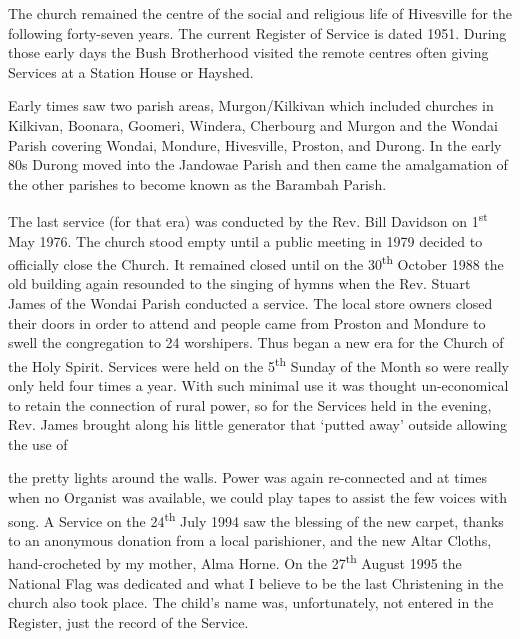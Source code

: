 The church remained the centre of the social and religious life of Hivesville for the following forty-seven years. The current Register of Service is dated 1951. During those early days the Bush Brotherhood visited the remote centres often giving Services at a Station House or Hayshed.

Early times saw two parish areas, Murgon/Kilkivan which included churches in Kilkivan, Boonara, Goomeri, Windera, Cherbourg and Murgon and the Wondai Parish covering Wondai, Mondure, Hivesville, Proston, and Durong. In the early 80s Durong moved into the Jandowae Parish and then came the amalgamation of the other parishes to become known as the Barambah Parish.

The last service (for that era) was conducted by the Rev. Bill Davidson on 1\textsuperscript{st} May 1976. The church stood empty until a public meeting in 1979 decided to officially close the Church. It remained closed until on the 30\textsuperscript{th} October 1988 the old building again resounded to the singing of hymns when the Rev. Stuart James of the Wondai Parish conducted a service. The local store owners closed their doors in order to attend and people came from Proston and Mondure to swell the congregation to 24 worshipers. Thus began a new era for the Church of the Holy Spirit. Services were held on the 5\textsuperscript{th} Sunday of the Month so were really only held four times a year. With such minimal use it was thought un-economical to retain the connection of rural power, so for the Services held in the evening, Rev. James brought along his little generator that `putted away' outside allowing the use of

the pretty lights around the walls. Power was again re-connected and at times when no Organist was available, we could play tapes to assist the few voices with song. A Service on the 24\textsuperscript{th} July 1994 saw the blessing of the new carpet, thanks to an anonymous donation from a local parishioner, and the new Altar Cloths, hand-crocheted by my mother, Alma Horne. On the 27\textsuperscript{th} August 1995 the National Flag was dedicated and what I believe to be the last Christening in the church also took place. The child's name was, unfortunately, not entered in the Register, just the record of the Service.

